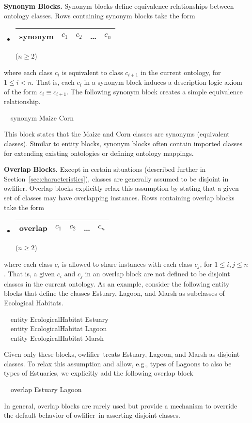 \documentclass[preprint,number]{elsarticle}
\newcommand{\owlifier}{\textsf{owlifier}}
\newcommand{\myblock}[1]{\vspace{12pt}\noindent\textbf{#1}}
\newcommand{\secref}[1]{Section~\ref{#1}}
\begin{document}
\myblock{Synonym Blocks.} Synonym blocks define equivalence
relationships between ontology classes.  Rows containing synonym
blocks take the form
\begin{itemize}
\item[] 
  \begin{tabular}{|l|l|l|l|l|}\hline
    \textsf{synonym} & $c_1$ & $c_2$ & \dots & $c_n$ \\ \hline 
  \end{tabular} \hfill ($n \ge 2$)
\end{itemize}
where each class $c_i$ is equivalent to class $c_{i+1}$ in the current
ontology, for $1 \le i < n$. That is, each $c_i$ in a synonym block
induces a description logic axiom of the form $c_i \equiv
c_{i+1}$. The following synonym block creates a simple equivalence
relationship.
\begin{tabbing}
  ~~\textsf{synonym} \textsf{Maize} \textsf{Corn}
\end{tabbing}
This block states that the Maize and Corn classes are synonyms
(equivalent classes). Similar to entity blocks, synonym blocks often
contain imported classes for extending existing ontologies or defining
ontology mappings.


\myblock{Overlap Blocks.} Except in certain situations (described
further in \secref{sec:characteristics}), classes are generally
assumed to be disjoint in \owlifier.  Overlap blocks explicitly relax
this assumption by stating that a given set of classes may have
overlapping instances. Rows containing overlap blocks take the form
\begin{itemize}
\item[] 
  \begin{tabular}{|l|l|l|l|l|}\hline
    \textsf{overlap} & $c_1$ & $c_2$ & \dots & $c_n$ \\ \hline 
  \end{tabular} \hfill ($n \ge 2$)
\end{itemize}
where each class $c_i$ is allowed to share instances with each class
$c_j$, for $1 \le i,j \le n$. That is, a given $c_i$ and $c_j$ in an
overlap block are not defined to be disjoint classes in the current
ontology. As an example, consider the following entity blocks that
define the classes Estuary, Lagoon, and Marsh as subclasses of
Ecological Habitats.
\begin{tabbing}
  ~~\textsf{entity} \textsf{EcologicalHabitat} \textsf{Estuary} \\ 
  ~~\textsf{entity} \textsf{EcologicalHabitat} \textsf{Lagoon} \\ 
  ~~\textsf{entity} \textsf{EcologicalHabitat} \textsf{Marsh} 
\end{tabbing}
Given only these blocks, \owlifier\ treats Estuary, Lagoon, and Marsh
as disjoint classes. To relax this assumption and allow, e.g., types
of Lagoons to also be types of Estuaries, we explicitly add the
following overlap block
\begin{tabbing}
  ~~\textsf{overlap} \textsf{Estuary} \textsf{Lagoon}
\end{tabbing}
In general, overlap blocks are rarely used but provide a mechanism to
override the default behavior of \owlifier\ in asserting disjoint
classes.
\end{document}
